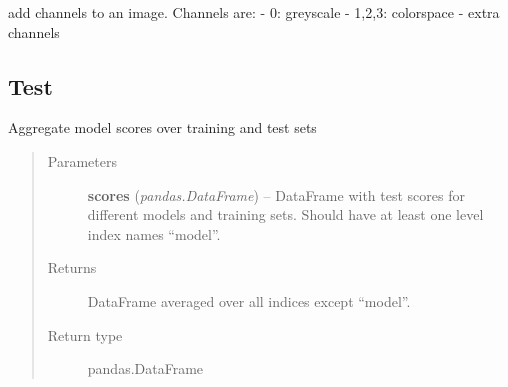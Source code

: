 \documentclass[letterpaper,10pt,english]{sphinxmanual}
\begin{document}
\begin{fulllineitems}
\label{classification:flamingo.classification.channels.add_channels}
add channels to an image.
Channels are:
- 0: greyscale
- 1,2,3: colorspace
- extra channels

\end{fulllineitems}



\subsection{Test}
\label{classification:test}\label{classification:module-flamingo.classification.test}

\begin{fulllineitems}
\label{classification:flamingo.classification.test.aggregate_scores}
Aggregate model scores over training and test sets
\begin{quote}\begin{description}
\item[{Parameters}] \leavevmode
\textbf{scores} (\emph{pandas.DataFrame}) -- DataFrame with test scores for different models and training sets.
Should have at least one level index names ``model''.

\item[{Returns}] \leavevmode
DataFrame averaged over all indices except ``model''.

\item[{Return type}] \leavevmode
pandas.DataFrame

\end{description}\end{quote}

\end{fulllineitems}

\end{document}
